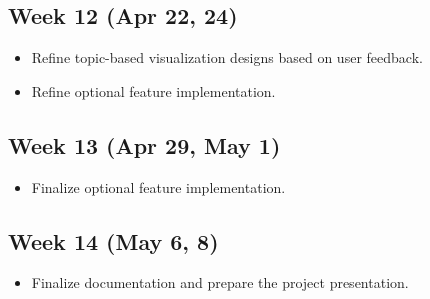 \documentclass{article}\usepackage{graphicx}
\begin{document}
\subsection*{Week 12 (Apr 22, 24)}
\begin{itemize}
    \item Refine topic-based visualization designs based on user feedback.
    \item Refine optional feature implementation.
\end{itemize}

\subsection*{Week 13 (Apr 29, May 1)}
\begin{itemize}
    \item Finalize optional feature implementation.
\end{itemize}

\subsection*{Week 14 (May 6, 8)}
\begin{itemize}
    \item Finalize documentation and prepare the project presentation.
\end{itemize}
\end{document}

